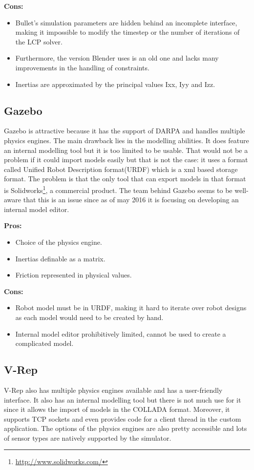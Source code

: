 \textbf{Cons:}
\begin{itemize}
\item Bullet's simulation parameters are hidden behind an incomplete interface, making it impossible to modify the timestep or the number of iterations of the LCP solver.
\item Furthermore, the version Blender uses is an old one and lacks many improvements in the handling of constraints.
\item Inertias are approximated by the principal values Ixx, Iyy and Izz.
\end{itemize}

\subsection{Gazebo}
Gazebo is attractive because it has the support of DARPA and handles multiple physics engines. The main drawback lies in the modelling abilities. It does feature an internal modelling tool but it is too limited to be usable. That would not be a problem if it could import models easily but that is not the case: it uses a format called Unified Robot Description format(URDF) which is a xml based storage format. The problem is that the only tool that can export models in that format is Solidworks\footnote{\url{http://www.solidworks.com/}}, a commercial product. The team behind Gazebo seems to be well-aware that this is an issue since as of may 2016 it is focusing on developing an internal model editor.

\textbf{Pros:}
\begin{itemize}
\item Choice of the physics engine.
\item Inertias definable as a matrix.
\item Friction represented in physical values.
\end{itemize}

\textbf{Cons:}
\begin{itemize}
\item Robot model must be in URDF, making it hard to iterate over robot designs as each model would need to be created by hand.
\item Internal model editor prohibitively limited, cannot be used to create a complicated model.
\end{itemize}

\subsection{V-Rep}
V-Rep also has multiple physics engines available and has a user-friendly interface. It also has an internal modelling tool but there is not much use for it since it allows the import of models in the COLLADA format. Moreover, it supports TCP sockets and even provides code for a client thread in the custom application. The options of the physics engines are also pretty accessible and lots of sensor types are natively supported by the simulator.

